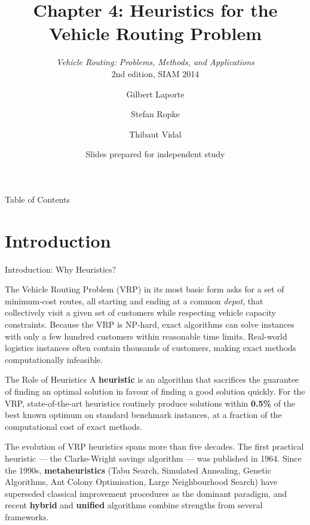 \documentclass[aspectratio=169,10pt]{beamer}
\title[Ch.4: Heuristics for VRP]{%
  Chapter 4: Heuristics for the Vehicle Routing Problem}
\subtitle{\textit{Vehicle Routing: Problems, Methods, and Applications}\\
  2nd edition, SIAM 2014}
\author{Gilbert Laporte \and Stefan Ropke \and Thibaut Vidal}
\date{Slides prepared for independent study}
\institute{SIAM Monographs on Discrete Mathematics and Applications}
\begin{document}
\begin{frame}
  \titlepage
\end{frame}

\begin{frame}[allowframebreaks]{Table of Contents}
  \tableofcontents
\end{frame}

\section{Introduction}

\begin{frame}[allowframebreaks]{Introduction: Why Heuristics?}

  The Vehicle Routing Problem (VRP) in its most basic form asks for a set
  of minimum-cost routes, all starting and ending at a common \emph{depot},
  that collectively visit a given set of customers while respecting vehicle
  capacity constraints.  Because the VRP is NP-hard, exact algorithms can
  solve instances with only a few hundred customers within reasonable time
  limits.  Real-world logistics instances often contain thousands of
  customers, making exact methods computationally infeasible.

  \begin{block}{The Role of Heuristics}
    A \textbf{heuristic} is an algorithm that sacrifices the guarantee of
    finding an optimal solution in favour of finding a good solution quickly.
    For the VRP, state-of-the-art heuristics routinely produce solutions
    within \textbf{0.5\%} of the best known optimum on standard benchmark
    instances, at a fraction of the computational cost of exact methods.
  \end{block}

  The evolution of VRP heuristics spans more than five decades.  The first
  practical heuristic --- the Clarke-Wright savings algorithm --- was
  published in 1964.  Since the 1990s, \textbf{metaheuristics} (Tabu
  Search, Simulated Annealing, Genetic Algorithms, Ant Colony Optimisation,
  Large Neighbourhood Search) have superseded classical improvement
  procedures as the dominant paradigm, and recent \textbf{hybrid} and
  \textbf{unified} algorithms combine strengths from several frameworks.


\end{frame}
\end{document}
